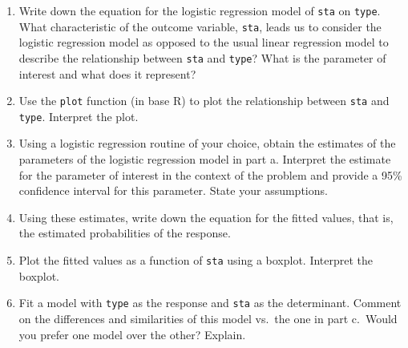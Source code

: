 \documentclass[letterpaper,12pt,twoside,]{pinp}
\providecommand{\tightlist}{%
  \setlength{\itemsep}{0pt}\setlength{\parskip}{0pt}}
\begin{document}
\begin{enumerate}
\def\labelenumi{\alph{enumi}.}
\tightlist
\item
  Write down the equation for the logistic regression model of
  \texttt{sta} on \texttt{type}. What characteristic of the outcome
  variable, \texttt{sta}, leads us to consider the logistic regression
  model as opposed to the usual linear regression model to describe the
  relationship between \texttt{sta} and \texttt{type}? What is the
  parameter of interest and what does it represent?\\
\item
  Use the \texttt{plot} function (in base R) to plot the relationship
  between \texttt{sta} and \texttt{type}. Interpret the plot.\\
\item
  Using a logistic regression routine of your choice, obtain the
  estimates of the parameters of the logistic regression model in part
  a. Interpret the estimate for the parameter of interest in the context
  of the problem and provide a 95\% confidence interval for this
  parameter. State your assumptions.\\
\item
  Using these estimates, write down the equation for the fitted values,
  that is, the estimated probabilities of the response.\\
\item
  Plot the fitted values as a function of \texttt{sta} using a boxplot.
  Interpret the boxplot.\\
\item
  Fit a model with \texttt{type} as the response and \texttt{sta} as the
  determinant. Comment on the differences and similarities of this model
  vs.~the one in part c.~Would you prefer one model over the other?
  Explain.
\end{enumerate}





\end{document}
